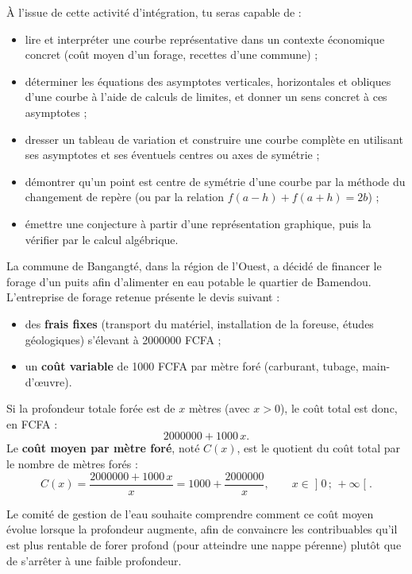 \documentclass[11pt]{article}
\newcounter{popsec}
\newcounter{popsub}
\newcommand{\courssub}[1]{%
  \stepcounter{popsub}%
  \par\vspace{9pt}\noindent{\popxbold\fontsize{11.5}{13}\selectfont\color{popink}{\color{poporange}\thepopsec.\thepopsub}\hspace{6pt}#1}\par\nopagebreak\vspace{4pt}
}
\begin{document}
À l'issue de cette activité d'intégration, tu seras capable de :
\begin{itemize}
\item lire et interpréter une courbe représentative dans un contexte économique concret (coût moyen d'un forage, recettes d'une commune) ;
\item déterminer les équations des asymptotes verticales, horizontales et obliques d'une courbe à l'aide de calculs de limites, et donner un sens concret à ces asymptotes ;
\item dresser un tableau de variation et construire une courbe complète en utilisant ses asymptotes et ses éventuels centres ou axes de symétrie ;
\item démontrer qu'un point est centre de symétrie d'une courbe par la méthode du changement de repère (ou par la relation $f(a-h)+f(a+h)=2b$) ;
\item émettre une conjecture à partir d'une représentation graphique, puis la vérifier par le calcul algébrique.
\end{itemize}

\courssub{Situation}

La commune de Bangangté, dans la région de l'Ouest, a décidé de financer le forage d'un puits afin d'alimenter en eau potable le quartier de Bamendou. L'entreprise de forage retenue présente le devis suivant :
\begin{itemize}
\item des \textbf{frais fixes} (transport du matériel, installation de la foreuse, études géologiques) s'élevant à \num{2000000} FCFA ;
\item un \textbf{coût variable} de \num{1000} FCFA par mètre foré (carburant, tubage, main-d'œuvre).
\end{itemize}

Si la profondeur totale forée est de $x$ mètres (avec $x > 0$), le coût total est donc, en FCFA :
\[ \num{2000000} + \num{1000}\,x. \]
Le \textbf{coût moyen par mètre foré}, noté $C(x)$, est le quotient du coût total par le nombre de mètres forés :
\[ C(x) = \frac{\num{2000000} + \num{1000}\,x}{x} = \num{1000} + \frac{\num{2000000}}{x}, \qquad x \in \mathopen]0\,;\,+\infty\mathclose[. \]

Le comité de gestion de l'eau souhaite comprendre comment ce coût moyen évolue lorsque la profondeur augmente, afin de convaincre les contribuables qu'il est plus rentable de forer profond (pour atteindre une nappe pérenne) plutôt que de s'arrêter à une faible profondeur.
\end{document}
